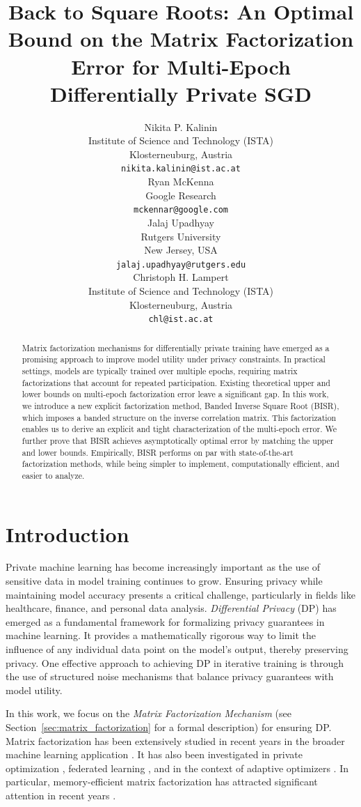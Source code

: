 \documentclass{article} %
\title{Back to Square Roots: An Optimal Bound on the Matrix Factorization Error for Multi-Epoch Differentially Private SGD}
\author{%
  Nikita P.  Kalinin  \\
  Institute of Science and Technology (ISTA)\\
  Klosterneuburg, Austria \\
  \texttt{nikita.kalinin@ist.ac.at} \\
  \And
   Ryan McKenna  \\
  Google Research\\
  \texttt{mckennar@google.com} \\
  \And
   Jalaj Upadhyay  \\
  Rutgers University\\
  New Jersey, USA \\
  \texttt{jalaj.upadhyay@rutgers.edu} \\
  \And
   Christoph H. Lampert \\
   Institute of Science and Technology (ISTA) \\
   Klosterneuburg, Austria \\
   \texttt{chl@ist.ac.at} \\
}
\begin{document}
\maketitle

\begin{abstract}
 Matrix factorization mechanisms for differentially private training have emerged as a promising approach to improve model utility under privacy constraints. In practical settings, models are typically trained over multiple epochs, requiring matrix factorizations that account for repeated participation. Existing  theoretical upper and lower bounds on multi-epoch factorization error leave a significant gap. In this work, we introduce a new explicit factorization method, Banded Inverse Square Root (BISR), which imposes a banded structure on the inverse correlation matrix. This factorization enables us to derive an explicit and tight characterization of the multi-epoch error. We further prove that BISR achieves asymptotically optimal error by matching the upper and lower bounds. Empirically, BISR performs on par with state-of-the-art factorization methods, while being simpler to implement, computationally efficient, and easier to analyze. 

\end{abstract}

\section{Introduction}
Private machine learning has become increasingly important as the use of sensitive data in model training continues to grow. Ensuring privacy while maintaining model accuracy presents a critical challenge, particularly in fields like healthcare, finance, and personal data analysis. \textit{Differential Privacy} (DP) has emerged as a fundamental framework for formalizing privacy guarantees in machine learning. It provides a mathematically rigorous way to limit the influence of any individual data point on the model's output, thereby preserving privacy. One effective approach to achieving DP in iterative training is through the use of structured noise mechanisms that balance privacy guarantees with model utility.

In this work, we focus on the \textit{Matrix Factorization Mechanism} (see Section~\ref{sec:matrix_factorization} for a formal description) for ensuring DP. Matrix factorization has been extensively studied in recent years in the broader machine learning application \citep{Kairouz, Denisov, ConstantMatters, henzinger2023almost, choquette2022multi, andersson2023smooth, Henzinger, kalinin2024, henzinger2025improved, pillutla2025correlated, henzinger2025normalized}. It has also been investigated in private optimization \citep{koloskova2023gradient, choquette2023correlated}, federated learning \citep{zhang2025locally, bienstock2025dmm}, and in the context of adaptive optimizers \citep{kalinin2025continual, ganesh2025design}. In particular, memory-efficient matrix factorization has attracted significant attention in recent years \citep{hasslefree2024, dvijotham2024efficient, andersson2024streaming, henzinger2025binned}.
\end{document}
